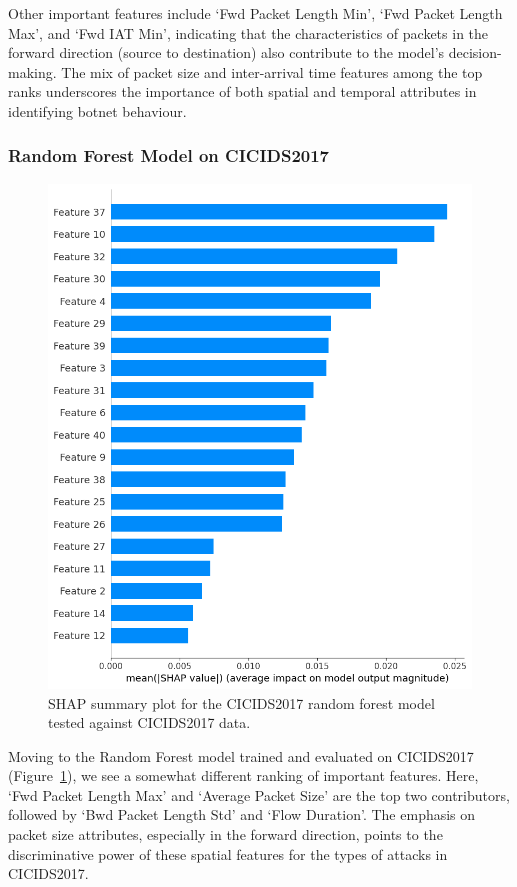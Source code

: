 Other important features include `Fwd Packet Length Min', `Fwd Packet Length Max', and `Fwd IAT Min', indicating that the characteristics of packets in the forward direction (source to destination) also contribute to the model's decision-making. The mix of packet size and inter-arrival time features among the top ranks underscores the importance of both spatial and temporal attributes in identifying botnet behaviour.

\subsubsection{Random Forest Model on CICIDS2017}\label{subsec:rf-cicids2017}

\begin{figure}[H]
\centering
\includegraphics[width=\textwidth]{img/SHAP_RFCICIDS2017_CICIDS2017.png}
\caption{SHAP summary plot for the CICIDS2017 random forest model tested against CICIDS2017 data.}\label{fig:shap_rfc_cicids2017_cicids2017}
\end{figure}

Moving to the Random Forest model trained and evaluated on CICIDS2017 (Figure~\ref{fig:shap_rfc_cicids2017_cicids2017}), we see a somewhat different ranking of important features. Here, `Fwd Packet Length Max' and `Average Packet Size' are the top two contributors, followed by `Bwd Packet Length Std' and `Flow Duration'. The emphasis on packet size attributes, especially in the forward direction, points to the discriminative power of these spatial features for the types of attacks in CICIDS2017.

